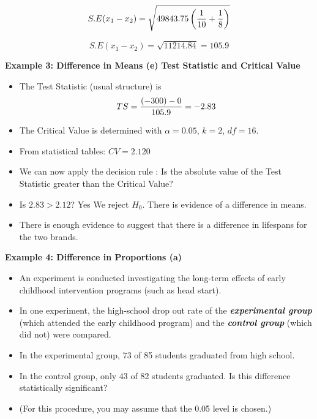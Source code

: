 \[ S.E(x_1 - x_2) = \sqrt{49843.75 \left({1\over 10}+{1\over 8} \right)}\]

\[ S.E(x_1 - x_2) = \sqrt{11214.84} = 105.9\]




\noindent \textbf{Example 3: Difference in Means (e) }
\textbf{Test Statistic and Critical Value}\\
\begin{itemize}
\item The Test Statistic (usual structure) is \[ TS  = {(-300) - 0 \over 105.9}  = -2.83 \]
\item The Critical Value is determined  with $\alpha = 0.05$, $k=2$, $df = 16 $. 
\item From statistical tables: $CV = 2.120$
\item We can now apply the decision rule : Is the absolute value of the Test Statistic greater than the Critical Value?
\item Is $2.83 > 2.12$? Yes We reject $H_0$. There is evidence of a difference in means. 
\item There is enough evidence to suggest that there is a difference in lifespans for the two brands.
\end{itemize}






\noindent \textbf{Example 4: Difference in Proportions (a)}
\begin{itemize}
\item An experiment is conducted investigating the long-term effects of early childhood intervention programs (such as head start).
\item In one experiment, the high-school drop out rate of the \textit{\textbf{experimental group}} (which attended the early childhood program)
 and the \textit{\textbf{control group}} (which did not) were compared.
\item In the experimental group, 73 of 85 students graduated from high school. \item In the control group, only 43 of 82 students graduated.
Is this difference statistically significant? \item(For this procedure, you may assume that the 0.05 level is chosen.) \end{itemize}



